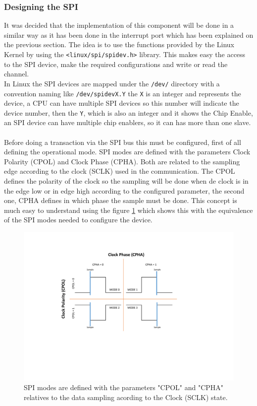 \subsubsection{Designing the SPI}\label{SSS:IOSharp-SPI-Design}
It was decided that the implementation of this component will be done in a similar way as it has been done in the interrupt port which has been explained on the previous section. The idea is to use the functions provided by the Linux Kernel by using the \verb!<linux/spi/spidev.h>! library. This makes easy the access to the SPI device, make the required configurations and write or read the channel.
\\
In Linux the SPI devices are mapped under the \verb!/dev/! directory with a convention naming like \verb!/dev/spidevX.Y! the \verb!X! is an integer and represents the device, a CPU can have multiple SPI devices so this number will indicate the device number, then the \verb!Y!, which is also an integer and it shows the Chip Enable, an SPI device can have multiple chip enablers, so it can has more than one slave.
\\
\\
Before doing a transaction via the SPI bus this must be configured, first of all defining the operational mode. SPI modes are defined with the parameters Clock Polarity (CPOL) and Clock Phase (CPHA). Both are related to the sampling edge according to the clock (SCLK) used in the communication. The CPOL defines the polarity of the clock so the sampling will be done when de clock is in the edge low or in edge high according to the configured parameter, the second one, CPHA defines in which phase the sample must be done. This concept is much easy to understand using the figure \ref{fig:spi-modes} which shows this with the equivalence of the SPI modes needed to configure the device.

\begin{figure}[H]\begin{center}
 \centering
  \captionsetup{justification=centering}
  \includegraphics[scale=0.7]{pictures/iosharp/spi-modes}
  \caption{SPI modes are defined with the parameters "CPOL" and "CPHA" relatives to the data sampling acording to the Clock (SCLK) state.\label{fig:spi-modes}}
\end{center}\end{figure}

